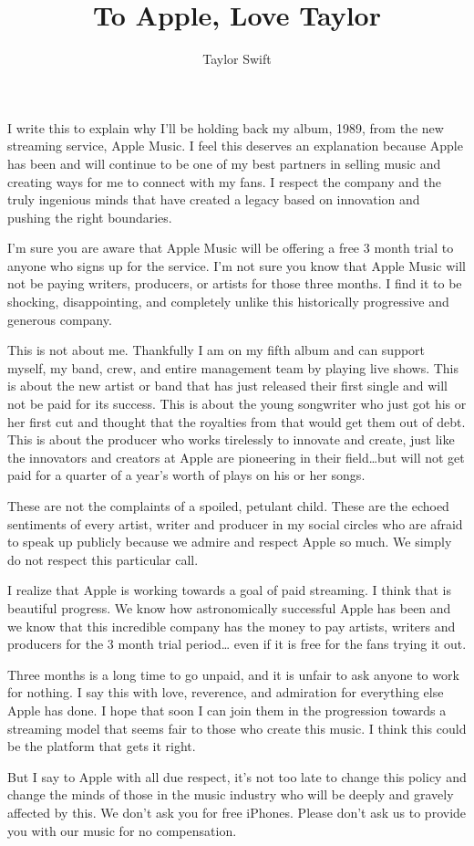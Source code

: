 \documentclass[a4paper, 12pt, oneside]{article}
\title{To Apple, Love Taylor}
\author{Taylor Swift}
\date{\DTMdate{2015-06-21}}
\begin{document}
\maketitle

I write this to explain why I’ll be holding back my album, 1989, from the new streaming service, Apple Music. I feel this deserves an explanation because Apple has been and will continue to be one of my best partners in selling music and creating ways for me to connect with my fans. I respect the company and the truly ingenious minds that have created a legacy based on innovation and pushing the right boundaries.

I’m sure you are aware that Apple Music will be offering a free 3 month trial to anyone who signs up for the service. I’m not sure you know that Apple Music will not be paying writers, producers, or artists for those three months. I find it to be shocking, disappointing, and completely unlike this historically progressive and generous company.

This is not about me. Thankfully I am on my fifth album and can support myself, my band, crew, and entire management team by playing live shows. This is about the new artist or band that has just released their first single and will not be paid for its success. This is about the young songwriter who just got his or her first cut and thought that the royalties from that would get them out of debt. This is about the producer who works tirelessly to innovate and create, just like the innovators and creators at Apple are pioneering in their field…but will not get paid for a quarter of a year’s worth of plays on his or her songs.

These are not the complaints of a spoiled, petulant child. These are the echoed sentiments of every artist, writer and producer in my social circles who are afraid to speak up publicly because we admire and respect Apple so much. We simply do not respect this particular call.

I realize that Apple is working towards a goal of paid streaming. I think that is beautiful progress. We know how astronomically successful Apple has been and we know that this incredible company has the money to pay artists, writers and producers for the 3 month trial period… even if it is free for the fans trying it out.

Three months is a long time to go unpaid, and it is unfair to ask anyone to work for nothing. I say this with love, reverence, and admiration for everything else Apple has done. I hope that soon I can join them in the progression towards a streaming model that seems fair to those who create this music. I think this could be the platform that gets it right.

But I say to Apple with all due respect, it’s not too late to change this policy and change the minds of those in the music industry who will be deeply and gravely affected by this. We don’t ask you for free iPhones. Please don’t ask us to provide you with our music for no compensation.
\end{document}
